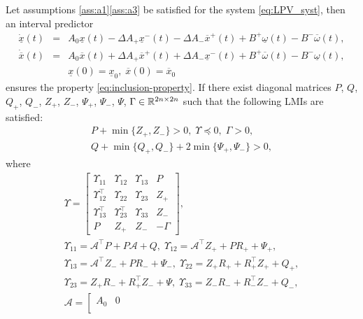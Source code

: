 \begin{theorem}
	\label{thm:main}
	\begin{leftbar}[theorembar]
	Let assumptions \ref{ass:a1}\textendash \ref{ass:a3} be satisfied for the system \eqref{eq:LPV_syst}, then an interval predictor
	\begin{eqnarray}
	\dot{\underline{x}}(t) & = & A_{0}\underline{x}(t)-\Delta A_{+}\underline{x}^{-}(t)-\Delta A_{-}\overline{x}^{+}(t)  +B^{+}\underline{\omega}(t)-B^{-}\overline{\omega}(t),\label{eq:interval-predictor}\\
	\dot{\overline{x}}(t) & = & A_{0}\overline{x}(t)+\Delta A_{+}\overline{x}^{+}(t)+\Delta A_{-}\underline{x}^{-}(t)  +B^{+}\overline{\omega}(t)-B^{-}\underline{\omega}(t),\nonumber \\
	&  & \underline{x}(0)=\underline{x}_{0},\;\overline{x}(0)=\overline{x}_{0}\nonumber 
	\end{eqnarray}
	ensures the property \eqref{eq:inclusion-property}. If there exist diagonal matrices $P$, $Q$, $Q_{+}$, $Q_{-}$, $Z_{+}$, $Z_{-}$, $\Psi_{+}$, $\Psi_{-}$, $\Psi$, $\Gamma\in\mathbb{R}^{2n\times2n}$ such that the following LMIs are satisfied:
	\begin{gather*}
	P+\min\{Z_{+},Z_{-}\}>0,\;\Upsilon\preceq0,\;\Gamma>0,\\
	Q+\min\{Q_{+},Q_{-}\}+2\min\{\Psi_{+},\Psi_{-}\}>0,
	\end{gather*}
	where{\footnotesize{}
		\begin{gather*}
		\Upsilon=\left[\begin{array}{cccc}
		\Upsilon_{11} & \Upsilon_{12} & \Upsilon_{13} & P\\
		\Upsilon_{12}^{\top} & \Upsilon_{22} & \Upsilon_{23} & Z_{+}\\
		\Upsilon_{13}^{\top} & \Upsilon_{23}^{\top} & \Upsilon_{33} & Z_{-}\\
		P & Z_{+} & Z_{-} & -\Gamma
		\end{array}\right],\\
		\Upsilon_{11}=\mathcal{A}^{\top}P+P\mathcal{A}+Q,\;\Upsilon_{12}=\mathcal{A}^{\top}Z_{+}+PR_{+}+\Psi_{+},\\
		\Upsilon_{13}=\mathcal{A}^{\top}Z_{-}+PR_{-}+\Psi_{-},\;\Upsilon_{22}=Z_{+}R_{+}+R_{+}^{\top}Z_{+}+Q_{+},\\
		\Upsilon_{23}=Z_{+}R_{-}+R_{+}^{\top}Z_{-}+\Psi,\;\Upsilon_{33}=Z_{-}R_{-}+R_{-}^{\top}Z_{-}+Q_{-},\\
		\mathcal{A}=\left[\begin{array}{cc}
		A_{0} & 0\\

\end{array}
\end{gather*}}
\end{leftbar}
\end{theorem}
